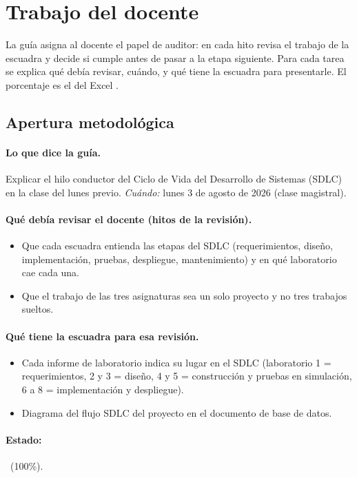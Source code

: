 \documentclass[a4paper,11pt]{article}
\begin{document}
\section{Trabajo del docente}
La guía asigna al docente el papel de auditor: en cada hito revisa el trabajo de la escuadra y decide si cumple antes de pasar a la etapa siguiente. Para cada tarea se explica qué debía revisar, cuándo, y qué tiene la escuadra para presentarle. El porcentaje es el del Excel .
\subsection{Apertura metodológica}
\paragraph{Lo que dice la guía.} Explicar el hilo conductor del Ciclo de Vida del Desarrollo de Sistemas (SDLC) en la clase del lunes previo. \textit{Cuándo:} lunes 3 de agosto de 2026 (clase magistral).
\paragraph{Qué debía revisar el docente (hitos de la revisión).}
\begin{itemize}
\item[$\square$] Que cada escuadra entienda las etapas del SDLC (requerimientos, diseño, implementación, pruebas, despliegue, mantenimiento) y en qué laboratorio cae cada una.
\item[$\square$] Que el trabajo de las tres asignaturas sea un solo proyecto y no tres trabajos sueltos.
\end{itemize}
\paragraph{Qué tiene la escuadra para esa revisión.}
\begin{itemize}
\item Cada informe de laboratorio indica su lugar en el SDLC (laboratorio 1 = requerimientos, 2 y 3 = diseño, 4 y 5 = construcción y pruebas en simulación, 6 a 8 = implementación y despliegue).
\item Diagrama del flujo SDLC del proyecto en el documento de base de datos.
\end{itemize}
\paragraph{Estado:} \cumple~(100\%).
\end{document}
